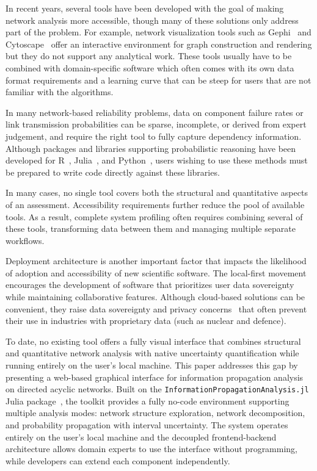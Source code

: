 \documentclass[twocolumn]{rps-esrel2026}
\begin{document}
In recent years, several tools have been developed with the goal of making network analysis more accessible, though many of these solutions only address part of the problem. For example, network visualization tools such as Gephi~\cite{bastian2009gephi} and Cytoscape~\cite{shannon2003cytoscape} offer an interactive environment for graph construction and rendering but they do not support any analytical work. These tools usually have to be combined with domain-specific software which often comes with its own data format requirements and a learning curve that can be steep for users that are not familiar with the algorithms.

In many network-based reliability problems, data on component failure rates or link transmission probabilities can be sparse, incomplete, or derived from expert judgement, and require the right tool to fully capture dependency information. Although packages and libraries supporting probabilistic reasoning have been developed for R~\cite{ferson2019pbar}, Julia~\cite{gray2022pba_julia}, and Python~\cite{gray2022pba}, users wishing to use these methods must be prepared to write code directly against these libraries.

In many cases, no single tool covers both the structural and quantitative aspects of an assessment. Accessibility requirements further reduce the pool of available tools. As a result, complete system profiling often requires combining several of these tools, transforming data between them and managing multiple separate workflows.

Deployment architecture is another important factor that impacts the likelihood of adoption and accessibility of new scientific software. The local-first movement~\cite{kleppmann2019local} encourages the development of software that prioritizes user data sovereignty while maintaining collaborative features. Although cloud-based solutions can be convenient, they raise data sovereignty and privacy concerns~\cite{hashizume2013analysis} that often prevent their use in industries with proprietary data (such as nuclear and defence).

To date, no existing tool offers a fully visual interface that combines structural and quantitative network analysis with native uncertainty quantification while running entirely on the user's local machine. This paper addresses this gap by presenting a web-based graphical interface for information propagation analysis on directed acyclic networks. Built on the \texttt{InformationPropagationAnalysis.jl} Julia package~\cite{infoprop2026_julia}, the toolkit provides a fully no-code environment supporting multiple analysis modes: network structure exploration, network decomposition, and probability propagation with interval uncertainty. The system operates entirely on the user's local machine and the decoupled frontend-backend architecture allows domain experts to use the interface without programming, while developers can extend each component independently.
\end{document}

